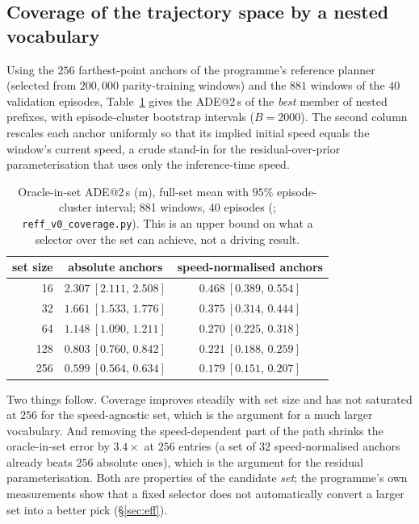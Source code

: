 \subsection{Coverage of the trajectory space by a nested vocabulary}
Using the $256$ farthest-point anchors of the programme's reference planner (selected from $200{,}000$ parity-training windows) and the $881$ windows of the $40$ validation episodes, Table~\ref{tab:cover} gives the ADE@2\,s of the \emph{best} member of nested prefixes, with episode-cluster bootstrap intervals ($B=2000$). The second column rescales each anchor uniformly so that its implied initial speed equals the window's current speed, a crude stand-in for the residual-over-prior parameterisation that uses only the inference-time speed.
\begin{table}[h]
\centering\small
\caption{Oracle-in-set ADE@2\,s (m), full-set mean with $95\%$ episode-cluster interval; 881 windows, 40 episodes (\evM; \texttt{reff\_v0\_coverage.py}). This is an upper bound on what a selector over the set can achieve, not a driving result.}
\label{tab:cover}
\begin{tabular}{@{}rcc@{}}
\toprule
set size & absolute anchors & speed-normalised anchors \\ \midrule
16 & $2.307\ [2.111,\,2.508]$ & $0.468\ [0.389,\,0.554]$ \\
32 & $1.661\ [1.533,\,1.776]$ & $0.375\ [0.314,\,0.444]$ \\
64 & $1.148\ [1.090,\,1.211]$ & $0.270\ [0.225,\,0.318]$ \\
128 & $0.803\ [0.760,\,0.842]$ & $0.221\ [0.188,\,0.259]$ \\
256 & $0.599\ [0.564,\,0.634]$ & $0.179\ [0.151,\,0.207]$ \\
\bottomrule
\end{tabular}
\end{table}
Two things follow. Coverage improves steadily with set size and has not saturated at $256$ for the speed-agnostic set, which is the argument for a much larger vocabulary. And removing the speed-dependent part of the path shrinks the oracle-in-set error by $3.4\times$ at $256$ entries (a set of $32$ speed-normalised anchors already beats $256$ absolute ones), which is the argument for the residual parameterisation. Both are properties of the candidate \emph{set}; the programme's own measurements show that a fixed selector does not automatically convert a larger set into a better pick (\S\ref{sec:eff}).

